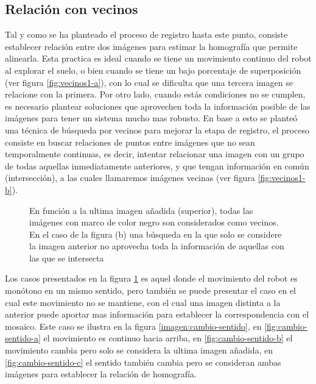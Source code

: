 \subsection{Relación con vecinos}

Tal y como se ha planteado el proceso de registro hasta este punto, consiste establecer relación entre dos imágenes para estimar la homografía que permite alinearla. Esta practica es ideal cuando se tiene un movimiento continuo del robot al explorar el suelo, o bien cuando se tiene un bajo porcentaje de superposición (ver figura \ref{fig:vecinos1-a}), con lo cual se dificulta que una tercera imagen se relacione con la primera. Por otro lado, cuando estás condiciones no se cumplen, es necesario plantear soluciones que aprovechen toda la información posible de las imágenes para tener un sistema mucho mas robusto. En base a esto se planteó una técnica de búsqueda por vecinos para mejorar la etapa de registro, el proceso consiste en buscar relaciones de puntos entre imágenes que no sean temporalmente continuas, es decir, intentar relacionar una imagen con un grupo de todas aquellas inmediatamente anteriores, y que tengan información en común (intersección), a las cuales llamaremos imágenes vecinas (ver figura \ref{fig:vecinos1-b}).


\begin{figure}[h]
	\centering     %
	\hspace{10mm}%
	\caption[Superposición de imagenes vecinas, mismo sentido]{En función a la ultima imagen añadida (superior), todas las imágenes con marco de color negro son considerados como vecinos. En el caso de la figura (b) una búsqueda en la que solo se considere la imagen anterior no aprovecha toda la información de aquellas con las que se intersecta}
	\label{imagen:vecinos1}
\end{figure}

Los casos presentados en la figura \ref{imagen:vecinos1} es aquel donde el movimiento del robot es monótono en un mismo sentido, pero también se puede presentar el caso en el cual este movimiento no se mantiene, con el cual una imagen distinta a la anterior puede aportar mas información para establecer la correspondencia con el mosaico. Este caso se ilustra en la figura \ref{imagen:cambio-sentido}, en \ref{fig:cambio-sentido-a} el movimiento es continuo hacia arriba, en \ref{fig:cambio-sentido-b} el movimiento cambia pero solo se considera la ultima imagen añadida, en \ref{fig:cambio-sentido-c} el sentido también cambia pero se consideran ambas imágenes para establecer la relación de homografía.

